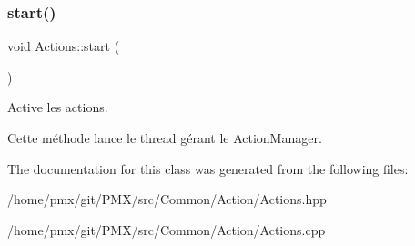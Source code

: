\subsubsection{\texorpdfstring{start()}{start()}}
{\footnotesize\ttfamily void Actions\+::start (\begin{DoxyParamCaption}{ }\end{DoxyParamCaption})}



Active les actions. 

Cette méthode lance le thread gérant le Action\+Manager. 

The documentation for this class was generated from the following files\+:\begin{DoxyCompactItemize}
\item 
/home/pmx/git/\+P\+M\+X/src/\+Common/\+Action/Actions.\+hpp\item 
/home/pmx/git/\+P\+M\+X/src/\+Common/\+Action/Actions.\+cpp\end{DoxyCompactItemize}

